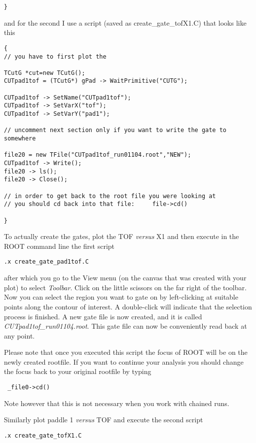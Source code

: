 \documentclass[11pt]{report}
\begin{document}
\begin{enumerate}
\begin{verbatim}
}
\end{verbatim}

and for the second I use a script 
(saved as create\_gate\_tofX1.C) that looks like this

\begin{verbatim}
{
// you have to first plot the

TCutG *cut=new TCutG();
CUTpad1tof = (TCutG*) gPad -> WaitPrimitive("CUTG");

CUTpad1tof -> SetName("CUTpad1tof"); 
CUTpad1tof -> SetVarX("tof");
CUTpad1tof -> SetVarY("pad1");

// uncomment next section only if you want to write the gate to somewhere

file20 = new TFile("CUTpad1tof_run01104.root","NEW");
CUTpad1tof -> Write();
file20 -> ls();
file20 -> Close();

// in order to get back to the root file you were looking at
// you should cd back into that file:     file->cd()

}
\end{verbatim}

To actually create the gates, plot the TOF {\it versus} X1 
and then execute in the ROOT command line the first script

\begin{verbatim}
.x create_gate_pad1tof.C
\end{verbatim}

after which you go to the View menu (on the canvas that was created with your plot) 
to select {\it Toolbar}. Click on the little scissors on the far right of the toolbar. Now
you can select the region you want to gate on by left-clicking
at suitable points along the contour of interest. A double-click will indicate that the
selection process is finished. A new gate file is now created, and it is called 
{\it CUTpad1tof\_run01104.root}. This gate file can now be conveniently read back at any point.

Please note that once you executed this script the focus of ROOT will be on the newly 
created rootfile. If you want to continue your analysis you should change the focus
back to your original rootfile by typing
\begin{verbatim} _file0->cd() \end{verbatim}
Note however that this is not necessary when you work with chained runs.

Similarly plot paddle 1 {\it versus} TOF and execute the second script

\begin{verbatim}
.x create_gate_tofX1.C
\end{verbatim}


\end{enumerate}
\end{document}
